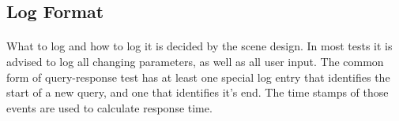 \subsection{Log Format}
\paragraph{}
What to log and how to log it is decided by the scene design.
In most tests it is advised to log all changing parameters, as well as all user input.
The common form of query-response test has at least one special log entry that identifies the start of a new query, and one that identifies it's end.
The time stamps of those events are used to calculate response time.



